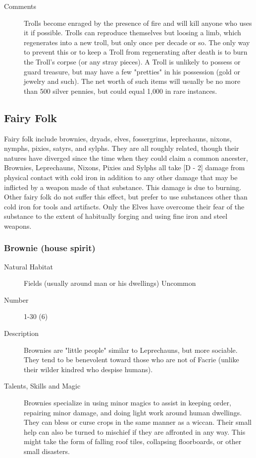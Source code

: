 \begin{multicols*}{2}
\begin{description}
\item[Comments] Trolls become enraged by the presence of fire and will kill
anyone who uses it if possible. Trolls can reproduce themselves but
loosing a limb, which regenerates into a new troll, but only once per
decade or so.  The only way to prevent this or to keep a Troll from
regenerating after death is to burn the Troll's corpse (or any stray
pieces).  A Troll is unlikely to possess or guard treasure, but may
have a few "pretties" in his possession (gold or jewelry and such).
The net worth of such items will usually be no more than 500 silver
pennies, but could equal 1,000 in rare instances.

\end{description}

\subsection{Fairy Folk}
Fairy folk include brownies, dryads, elves, fossergrims, leprechauns,
nixons, nymphs, pixies, satyrs, and sylphs.  They are all roughly
related, though their natures have diverged since the time when they
could claim a common ancester, Brownies, Leprechauns, Nixons, Pixies
and Sylphs all take [D - 2] damage from physical contact with cold
iron in addition to any other damage that may be inflicted by a weapon
made of that substance.  This damage is due to burning. Other fairy
folk do not suffer this effect, but prefer to use substances other
than cold iron for tools and artifacts. Only the Elves have overcome
their fear of the substance to the extent of habitually forging and
using fine iron and steel weapons.

\subsubsection{Brownie (house spirit)}

\begin{description}
\item[Natural Habitat] Fields (usually around man or his dwellings) Uncommon

\item[Number] 1-30 (6)

\item[Description] Brownies are "little people" similar to Leprechauns, but
more sociable. They tend to be benevolent toward those who are not of
Facrie (unlike their wilder kindred who despise humans).

\item[Talents, Skills and Magic] Brownies specialize in using minor magics to assist in
keeping order, repairing minor damage, and doing light work around
human dwellings. They can bless or curse crops in the same manner as a
wiccan. Their small help can also be turned to mischief if they are
affronted in any way. This might take the form of falling roof tiles,
collapsing floorboards, or other small disasters.


\end{description}
\end{multicols*}

